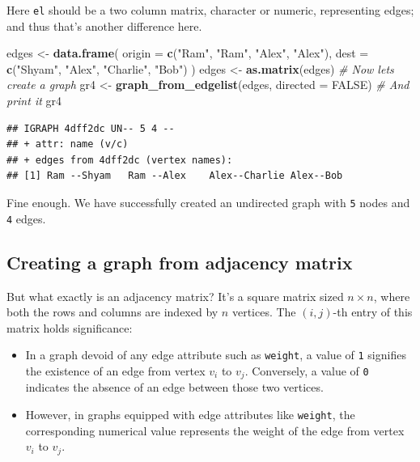 \documentclass[
]{book}
\newenvironment{Shaded}{\begin{snugshade}}{\end{snugshade}}
\newcommand{\AttributeTok}[1]{\textcolor[rgb]{0.13,0.29,0.53}{#1}}
\newcommand{\CommentTok}[1]{\textcolor[rgb]{0.56,0.35,0.01}{\textit{#1}}}
\newcommand{\ConstantTok}[1]{\textcolor[rgb]{0.56,0.35,0.01}{#1}}
\newcommand{\FunctionTok}[1]{\textcolor[rgb]{0.13,0.29,0.53}{\textbf{#1}}}
\newcommand{\NormalTok}[1]{#1}
\newcommand{\OtherTok}[1]{\textcolor[rgb]{0.56,0.35,0.01}{#1}}
\newcommand{\StringTok}[1]{\textcolor[rgb]{0.31,0.60,0.02}{#1}}
\providecommand{\tightlist}{%
  \setlength{\itemsep}{0pt}\setlength{\parskip}{0pt}}
\begin{document}
Here \texttt{el} should be a two column matrix, character or numeric, representing edges; and thus that's another difference here.

\begin{Shaded}
\begin{Highlighting}[]
\NormalTok{edges }\OtherTok{\textless{}{-}} \FunctionTok{data.frame}\NormalTok{(}
  \AttributeTok{origin =} \FunctionTok{c}\NormalTok{(}\StringTok{"Ram"}\NormalTok{, }\StringTok{"Ram"}\NormalTok{, }\StringTok{"Alex"}\NormalTok{, }\StringTok{"Alex"}\NormalTok{), }
  \AttributeTok{dest =} \FunctionTok{c}\NormalTok{(}\StringTok{"Shyam"}\NormalTok{, }\StringTok{"Alex"}\NormalTok{, }\StringTok{"Charlie"}\NormalTok{, }\StringTok{"Bob"}\NormalTok{)}
\NormalTok{)}
\NormalTok{edges }\OtherTok{\textless{}{-}} \FunctionTok{as.matrix}\NormalTok{(edges)}
\CommentTok{\# Now let\textquotesingle{}s create a graph}
\NormalTok{gr4 }\OtherTok{\textless{}{-}} \FunctionTok{graph\_from\_edgelist}\NormalTok{(edges, }\AttributeTok{directed =} \ConstantTok{FALSE}\NormalTok{)}
\CommentTok{\# And print it}
\NormalTok{gr4}
\end{Highlighting}
\end{Shaded}

\begin{verbatim}
## IGRAPH 4dff2dc UN-- 5 4 -- 
## + attr: name (v/c)
## + edges from 4dff2dc (vertex names):
## [1] Ram --Shyam   Ram --Alex    Alex--Charlie Alex--Bob
\end{verbatim}

Fine enough. We have successfully created an undirected graph with \texttt{5} nodes and \texttt{4} edges.

\hypertarget{creating-a-graph-from-adjacency-matrix}{%
\subsection{Creating a graph from adjacency matrix}\label{creating-a-graph-from-adjacency-matrix}}

But what exactly is an adjacency matrix? It's a square matrix sized \(n \times n\), where both the rows and columns are indexed by \(n\) vertices. The \((i, j)\)-th entry of this matrix holds significance:

\begin{itemize}
\tightlist
\item
  In a graph devoid of any edge attribute such as \texttt{weight}, a value of \texttt{1} signifies the existence of an edge from vertex \(v_{i}\) to \(v_j\). Conversely, a value of \texttt{0} indicates the absence of an edge between those two vertices.
\item
  However, in graphs equipped with edge attributes like \texttt{weight}, the corresponding numerical value represents the weight of the edge from vertex \(v_{i}\) to \(v_j\).
\end{itemize}
\end{document}
